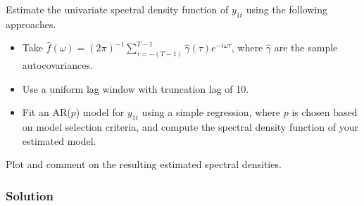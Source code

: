 \documentclass[oneside, a4paper]{amsart}
\begin{document}
Estimate the univariate spectral density function of $y_{1t}$ using the following approaches.
\begin{itemize}
\item
Take $\hat f(\omega) = (2\pi)^{-1} \sum_{\tau=-(T-1)}^{T-1} \hat \gamma(\tau) e^{-i \omega \tau}$, where $\hat \gamma$ are the sample autocovariances. 
\item
Use a uniform lag window with truncation lag of 10.
\item
Fit an AR($p$) model for $y_{1t}$ using a simple regression, where $p$ is chosen based on model selection criteria, and compute the spectral density function of your estimated model.
\end{itemize}
Plot and comment on the resulting estimated spectral densities.


\subsubsection*{Solution} 
\end{document}
